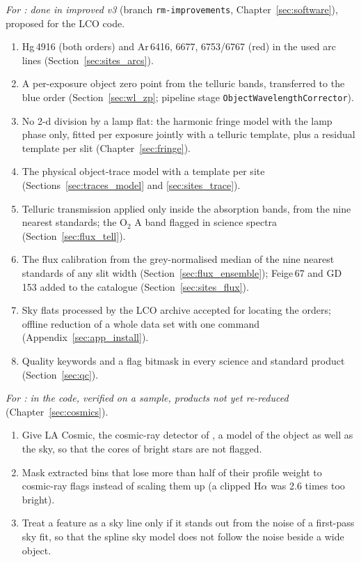 \textit{For \banzai{}: done in improved v3} (branch \texttt{rm-improvements}, Chapter~\ref{sec:software}), proposed for
the LCO code.
\begin{enumerate}
\item Hg\,4916 (both orders) and Ar\,6416, 6677, 6753/6767 (red) in the used arc lines (Section~\ref{sec:sites_arcs}).
\item A per-exposure object zero point from the telluric bands, transferred to the blue order (Section~\ref{sec:wl_zp};
pipeline stage \texttt{ObjectWavelengthCorrector}).
\item No 2-d division by a lamp flat: the harmonic fringe model with the lamp phase only, fitted per exposure jointly
with a telluric template, plus a residual template per slit (Chapter~\ref{sec:fringe}).
\item The physical object-trace model with a template per site (Sections~\ref{sec:traces_model} and
\ref{sec:sites_trace}).
\item Telluric transmission applied only inside the absorption bands, from the nine nearest standards; the O$_2$ A band
flagged in science spectra (Section~\ref{sec:flux_tell}).
\item The flux calibration from the grey-normalised median of the nine nearest standards of any slit width
(Section~\ref{sec:flux_ensemble}); Feige\,67 and GD\,153 added to the catalogue (Section~\ref{sec:sites_flux}).
\item Sky flats processed by the LCO archive accepted for locating the orders; offline reduction of a whole data set
with one command (Appendix~\ref{sec:app_install}).
\item Quality keywords and a flag bitmask in every science and standard product (Section~\ref{sec:qc}).
\end{enumerate}

\textit{For \banzai{}: in the code, verified on a sample, products not yet re-reduced} (Chapter~\ref{sec:cosmics}).
\begin{enumerate}
\item Give LA Cosmic, the cosmic-ray detector of \banzai{}, a model of the object as well as the sky, so that the cores of bright stars are not flagged.
\item Mask extracted bins that lose more than half of their profile weight to cosmic-ray flags instead of scaling
them up (a clipped H$\alpha$ was 2.6 times too bright).
\item Treat a feature as a sky line only if it stands out from the noise of a first-pass sky fit, so that the spline
sky model does not follow the noise beside a wide object.
\end{enumerate}

